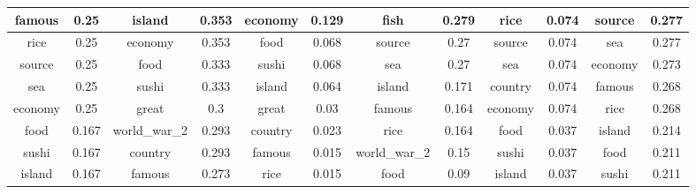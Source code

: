 \documentclass[12pt]{article}
\numberwithin{equation}{section}
\begin{document}
\begin{spacing}{1.5}
\begin{table}[H]
{\begin{tabular}{|cc|cc|cc|cc|cc|cc|}
			\multicolumn{1}{|c|}{famous}        & 0.25    & \multicolumn{1}{c|}{island}        & 0.353   & \multicolumn{1}{c|}{economy}       & 0.129   & \multicolumn{1}{c|}{fish}          & 0.279   & \multicolumn{1}{c|}{rice}          & 0.074   & \multicolumn{1}{c|}{source}        & 0.277   \\ \hline
			\multicolumn{1}{|c|}{rice}          & 0.25    & \multicolumn{1}{c|}{economy}       & 0.353   & \multicolumn{1}{c|}{food}          & 0.068   & \multicolumn{1}{c|}{source}        & 0.27    & \multicolumn{1}{c|}{source}        & 0.074   & \multicolumn{1}{c|}{sea}           & 0.277   \\ \hline
			\multicolumn{1}{|c|}{source}        & 0.25    & \multicolumn{1}{c|}{food}          & 0.333   & \multicolumn{1}{c|}{sushi}         & 0.068   & \multicolumn{1}{c|}{sea}           & 0.27    & \multicolumn{1}{c|}{sea}           & 0.074   & \multicolumn{1}{c|}{economy}       & 0.273   \\ \hline
			\multicolumn{1}{|c|}{sea}           & 0.25    & \multicolumn{1}{c|}{sushi}         & 0.333   & \multicolumn{1}{c|}{island}        & 0.064   & \multicolumn{1}{c|}{island}        & 0.171   & \multicolumn{1}{c|}{country}       & 0.074   & \multicolumn{1}{c|}{famous}        & 0.268   \\ \hline
			\multicolumn{1}{|c|}{economy}       & 0.25    & \multicolumn{1}{c|}{great}         & 0.3     & \multicolumn{1}{c|}{great}         & 0.03    & \multicolumn{1}{c|}{famous}        & 0.164   & \multicolumn{1}{c|}{economy}       & 0.074   & \multicolumn{1}{c|}{rice}          & 0.268   \\ \hline
			\multicolumn{1}{|c|}{food}          & 0.167   & \multicolumn{1}{c|}{world\_war\_2} & 0.293   & \multicolumn{1}{c|}{country}       & 0.023   & \multicolumn{1}{c|}{rice}          & 0.164   & \multicolumn{1}{c|}{food}          & 0.037   & \multicolumn{1}{c|}{island}        & 0.214   \\ \hline
			\multicolumn{1}{|c|}{sushi}         & 0.167   & \multicolumn{1}{c|}{country}       & 0.293   & \multicolumn{1}{c|}{famous}        & 0.015   & \multicolumn{1}{c|}{world\_war\_2} & 0.15    & \multicolumn{1}{c|}{sushi}         & 0.037   & \multicolumn{1}{c|}{food}          & 0.211   \\ \hline
			\multicolumn{1}{|c|}{island}        & 0.167   & \multicolumn{1}{c|}{famous}        & 0.273   & \multicolumn{1}{c|}{rice}          & 0.015   & \multicolumn{1}{c|}{food}          & 0.09    & \multicolumn{1}{c|}{island}        & 0.037   & \multicolumn{1}{c|}{sushi}         & 0.211   \\ \hline

\end{tabular}}
\end{table}
\end{spacing}
\end{document}
